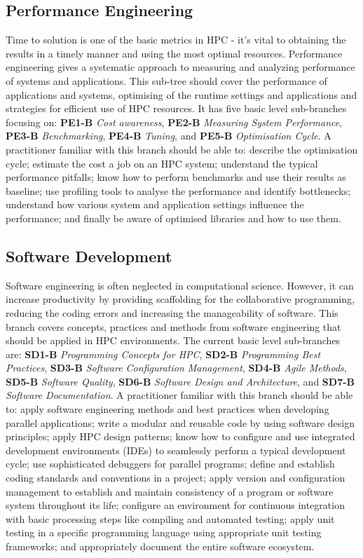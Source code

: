 \documentclass[jocse]{jocseart}
\begin{document}
\subsection{Performance Engineering}

Time to solution is one of the basic metrics in HPC - it’s vital to obtaining the results in a timely manner and using the most optimal resources. Performance engineering gives a systematic approach to measuring and analyzing performance of systems and applications. This sub-tree should cover the performance of applications and systems, optimising of the runtime settings and applications and strategies for efficient use of HPC resources. It has five basic level sub-branches focusing on: \textbf{PE1-B} \textit{Cost awareness}, \textbf{PE2-B} \textit{Measuring System Performance}, \textbf{PE3-B} \textit{Benchmarking}, \textbf{PE4-B} \textit{Tuning}, and \textbf{PE5-B} \textit{Optimisation Cycle}.
A practitioner familiar with this branch should be able to: describe the optimisation cycle; estimate the cost a job on an HPC system; understand the typical performance pitfalls; know how to perform benchmarks and use their results as baseline; use profiling tools to analyse the performance and identify bottlenecks; understand how various system and application settings influence the performance; and finally be aware of optimised libraries and how to use them.

\subsection{Software Development}

Software engineering is often neglected in computational science. However, it can increase productivity by providing scaffolding for the collaborative programming, reducing the coding errors and increasing the manageability of software. This branch covers concepts, practices and methods from software engineering that should be applied in HPC environments. The current basic level sub-branches are: \textbf{SD1-B} \textit{Programming Concepts for HPC}, \textbf{SD2-B} \textit{Programming Best Practices}, \textbf{SD3-B} \textit{Software Configuration Management}, \textbf{SD4-B} \textit{Agile Methods}, \textbf{SD5-B} \textit{Software Quality}, \textbf{SD6-B} \textit{Software Design and Architecture}, and \textbf{SD7-B} \textit{Software Documentation}. A practitioner familiar with this branch should be able to: apply software engineering methods and best practices when developing parallel applications;  write a modular and reusable code by using software design principles; apply HPC design patterns; know how to configure and use integrated development environments (IDEs) to seamlessly perform a typical development cycle; use sophisticated debuggers for parallel programs; define and establish coding standards and conventions in a project; apply version and configuration management to establish and maintain consistency of a program or software system throughout its life; configure an environment for continuous integration with basic processing steps like compiling and automated testing; apply unit testing in a specific programming language using appropriate unit testing frameworks; and appropriately document the entire software ecosystem. 
\end{document}
